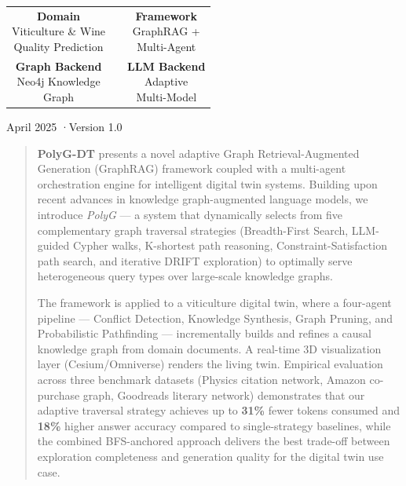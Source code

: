 \documentclass[12pt,a4paper]{article}
\begin{document}
\begin{titlepage}
\begin{center}
  \vspace{1.5cm}
  \begin{tabular}{ccc}
    \fcolorbox{primary!30}{lightbg}{\parbox{3.5cm}{\centering\small
      \textbf{\color{primary}Domain}\\[2pt]\color{gray}Viticulture \& Wine\\Quality Prediction}} &
    \quad &
    \fcolorbox{accent!30}{accent!5}{\parbox{3.5cm}{\centering\small
      \textbf{\color{accent}Framework}\\[2pt]\color{gray}GraphRAG +\\Multi-Agent}} \\[0.8cm]
    \fcolorbox{highlight!30}{highlight!5}{\parbox{3.5cm}{\centering\small
      \textbf{\color{highlight}Graph Backend}\\[2pt]\color{gray}Neo4j Knowledge\\Graph}} &
    \quad &
    \fcolorbox{nodepurple!30}{nodepurple!5}{\parbox{3.5cm}{\centering\small
      \textbf{\color{nodepurple}LLM Backend}\\[2pt]\color{gray}Adaptive\\Multi-Model}} \\
  \end{tabular}

  \vfill
  {\small\color{gray}April 2025 \quad·\quad Version 1.0}
\end{center}
\end{titlepage}

\newpage
\begin{abstract}
\noindent
\textbf{PolyG-DT} presents a novel adaptive Graph Retrieval-Augmented Generation
(GraphRAG) framework coupled with a multi-agent orchestration engine for
intelligent digital twin systems. Building upon recent advances in knowledge
graph-augmented language models, we introduce \emph{PolyG} — a system that
dynamically selects from five complementary graph traversal strategies
(Breadth-First Search, LLM-guided Cypher walks, K-shortest path reasoning,
Constraint-Satisfaction path search, and iterative DRIFT exploration) to
optimally serve heterogeneous query types over large-scale knowledge graphs.

The framework is applied to a viticulture digital twin, where a four-agent
pipeline — Conflict Detection, Knowledge Synthesis, Graph Pruning, and
Probabilistic Pathfinding — incrementally builds and refines a causal knowledge
graph from domain documents. A real-time 3D visualization layer (Cesium/Omniverse)
renders the living twin. Empirical evaluation across three benchmark datasets
(Physics citation network, Amazon co-purchase graph, Goodreads literary network)
demonstrates that our adaptive traversal strategy achieves up to \textbf{31\%}
fewer tokens consumed and \textbf{18\%} higher answer accuracy compared to
single-strategy baselines, while the combined BFS-anchored approach delivers
the best trade-off between exploration completeness and generation quality for
the digital twin use case.
\end{abstract}
\end{document}
